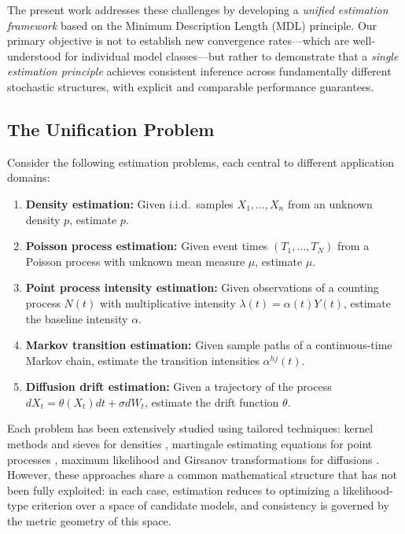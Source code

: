 \documentclass[preprint,review,12pt]{article}
\begin{document}
	The present work addresses these challenges by developing a \emph{unified 
		estimation framework} based on the Minimum Description Length (MDL) principle. 
	Our primary objective is not to establish new convergence rates---which are 
	well-understood for individual model classes---but rather to demonstrate that 
	a \emph{single estimation principle} achieves consistent inference across 
	fundamentally different stochastic structures, with explicit and comparable 
	performance guarantees.
	
	\subsection{The Unification Problem}
	
	Consider the following estimation problems, each central to different 
	application domains:
	
	\begin{enumerate}[label=(\roman*)]
	\item \textbf{Density estimation:} Given i.i.d.\ samples $X_1, \ldots, X_n$ 
	from an unknown density $p$, estimate $p$.
	
	\item \textbf{Poisson process estimation:} Given event times 
	$(T_1, \ldots, T_N)$ from a Poisson process with unknown mean measure 
	$\mu$, estimate $\mu$.
	
	\item \textbf{Point process intensity estimation:} Given observations of 
	a counting process $N(t)$ with multiplicative intensity 
	$\lambda(t) = \alpha(t) Y(t)$, estimate the baseline intensity $\alpha$.
	
	\item \textbf{Markov transition estimation:} Given sample paths of a 
	continuous-time Markov chain, estimate the transition intensities 
	$\alpha^{hj}(t)$.
	
	\item \textbf{Diffusion drift estimation:} Given a trajectory of the 
	process $dX_t = \theta(X_t) dt + \sigma dW_t$, estimate the drift 
	function $\theta$.
\end{enumerate}

Each problem has been extensively studied using tailored techniques: kernel 
methods and sieves for densities \citep{Devroye2001}, martingale estimating 
equations for point processes \citep{Andersen1993}, maximum likelihood and 
Girsanov transformations for diffusions \citep{Kutoyants2004}. However, these 
approaches share a common mathematical structure that has not been fully 
exploited: in each case, estimation reduces to optimizing a likelihood-type 
criterion over a space of candidate models, and consistency is governed by 
the metric geometry of this space.
\end{document}
